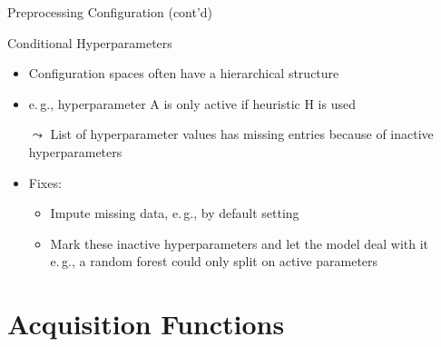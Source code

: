 \begin{frame}[c]{Preprocessing Configuration (cont'd)}

\begin{block}{Conditional Hyperparameters}
\begin{itemize}
\item Configuration spaces often have a hierarchical structure
\item e.$\,$g., hyperparameter A is only active if heuristic H is used
\pause
\item[$\leadsto$] List of hyperparameter values has missing entries because of inactive hyperparameters
\medskip
\pause
\item Fixes:
\begin{itemize}
\item Impute missing data, e.$\,$g., by default setting
\item Mark these inactive hyperparameters and let the model deal with it\\
e.$\,$g., a random forest could only split on active parameters
\end{itemize}
\end{itemize}
\end{block}

\end{frame}

\section{Acquisition Functions}

